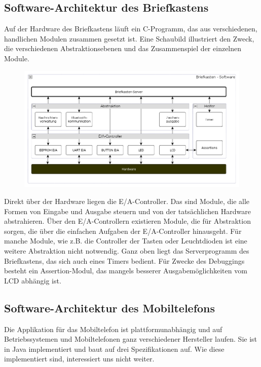 \documentclass[ngerman]{article}
\begin{document}
        \subsection{Software-Architektur des Briefkastens}

Auf der Hardware des Briefkastens läuft ein C-Programm, das aus verschiedenen, handlichen Modulen
zusammen gesetzt ist. Eine Schaubild illustriert den Zweck, die verschiedenen Abstraktionsebenen
und das Zusammenspiel der einzelnen Module.

\begin{figure}[h!] \begin{center}
    \includegraphics[width=\textwidth]{media/letterbox-arch}
\end{center} \end{figure}

Direkt über der Hardware liegen die E/A-Controller. Das sind Module, die alle Formen von Eingabe
und Ausgabe steuern und von der tatsächlichen Hardware abstrahieren. Über den E/A-Controllern
existieren Module, die für Abstraktion sorgen, die über die einfachen Aufgaben der E/A-Controller
hinausgeht. Für manche Module, wie z.B. die Controller der Tasten oder Leuchtdioden ist eine weitere
Abstraktion nicht notwendig. Ganz oben liegt das Serverprogramm des Briefkastens, das sich auch
eines Timers bedient. Für Zwecke des Debuggings besteht ein Assertion-Modul, das mangels besserer
Ausgabemöglichkeiten vom LCD abhängig ist.


        \subsection{Software-Architektur des Mobiltelefons}

Die Applikation für das Mobiltelefon ist plattformunabhängig und auf Betriebssystemen und
Mobiltelefonen ganz verschiedener Hersteller laufen. Sie ist in Java implementiert und baut
auf drei Spezifikationen auf. Wie diese implementiert sind, interessiert uns nicht weiter.
\end{document}
